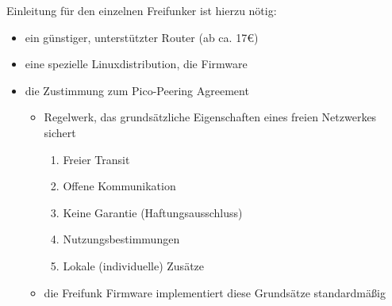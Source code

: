\begin{frame}{Einleitung}
	für den einzelnen Freifunker ist hierzu nötig:
	\begin{itemize}
		\item<1-> ein günstiger, unterstützter Router (ab ca. 17€)
		\item<1-> eine spezielle Linuxdistribution, die Firmware
		\item<1-> die Zustimmung zum \glqq Pico-Peering Agreement\grqq
							\begin{itemize}
								\item<2-> Regelwerk, das grundsätzliche Eigenschaften eines freien Netzwerkes sichert
													\begin{enumerate}
														\item Freier Transit
														\item Offene Kommunikation
														\item Keine Garantie (Haftungsausschluss)
														\item Nutzungsbestimmungen
														\item Lokale (individuelle) Zusätze
													\end{enumerate}
							\item<2-> die Freifunk Firmware implementiert diese Grundsätze standardmäßig
							\end{itemize}
	\end{itemize}
\end{frame}